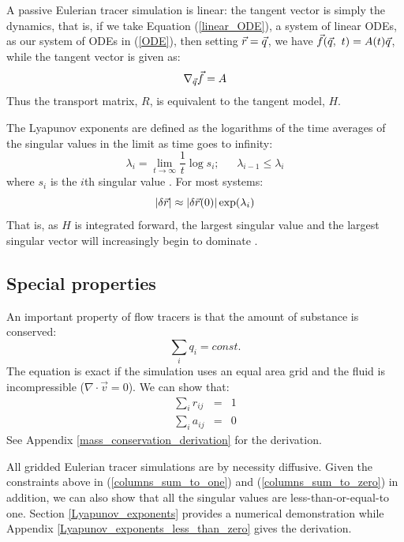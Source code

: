 \documentclass{article}
\begin{document}
A passive Eulerian tracer simulation is linear: the tangent vector is simply
the dynamics, that is,
if we take Equation (\ref{linear_ODE}), a system of linear ODEs,
as our system of ODEs in
(\ref{ODE}), then setting $\vec r=\vec q$, 
we have $\vec f(\vec q, ~t)=A(t) \vec q$,
while the tangent vector is given as:
\begin{equation}
	\nabla_{\vec q} \vec f = A
\end{equation}
Thus the transport matrix, $R$, is equivalent to the tangent model, $H$.

The Lyapunov exponents are defined as the logarithms of the time averages
of the singular values in the limit as time goes to infinity:
\begin{equation}
\lambda_i = \lim_{t \rightarrow \infty} \frac{1}{t} \log s_i;
~~~~~~~\lambda_{i-1} \le \lambda_i
\end{equation}
where $s_i$ is the $i$th singular value \citep{Ott1993}.
For most systems:
\begin{equation}
|\delta \vec r| \approx |\delta \vec r(0) | \exp(\lambda_i)
\label{lambda1}
\end{equation}
That is, as $H$ is integrated forward, the largest singular value and
the largest singular vector will increasingly begin to dominate
\citep{Ott1993}.

\subsection{Special properties}

An important property of flow tracers is that the amount of substance is 
conserved:
\begin{equation}
\sum_i q_i = const.
\end{equation}
The equation is exact if the simulation uses an equal area grid
and the fluid is incompressible ($\nabla \cdot \vec v=0$).
We can show that:
\begin{eqnarray}
\sum_i r_{ij} & = & 1 
\label{columns_sum_to_one}\\
\sum_i a_{ij} & = & 0
\label{columns_sum_to_zero}
\end{eqnarray}
See Appendix \ref{mass_conservation_derivation} for the derivation.

All gridded Eulerian tracer simulations are by necessity diffusive. 
Given the constraints above in (\ref{columns_sum_to_one}) and
(\ref{columns_sum_to_zero}) in addition, 
we can also show that all the singular values are less-than-or-equal-to one.
Section \ref{Lyapunov_exponents} provides a numerical demonstration while 
Appendix \ref{Lyapunov_exponents_less_than_zero} gives the derivation.
\end{document}
